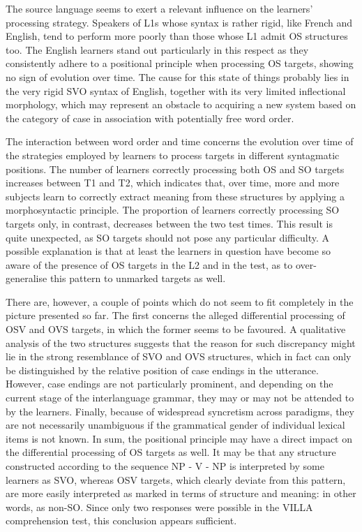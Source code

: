 The source language seems to exert a relevant influence on the learners' processing strategy. Speakers of L1s whose syntax is rather rigid, like French and English, tend to perform more poorly than those whose L1 admit OS structures too. The English learners stand out particularly in this respect as they consistently adhere to a positional principle when processing OS targets, showing no sign of evolution over time. The cause for this state of things probably lies in the very rigid SVO syntax of English, together with its very limited inflectional morphology, which may represent an obstacle to acquiring a new system based on the category of case in association with potentially free word order.

The interaction between word order and time concerns the evolution over time of the strategies employed by learners to process targets in different syntagmatic positions. The number of learners correctly processing both OS and SO targets increases between T1 and T2, which indicates that, over time, more and more subjects learn to correctly extract meaning from these structures by applying a morphosyntactic principle. The proportion of learners correctly processing SO targets only, in contrast, decreases between the two test times. This result is quite unexpected, as SO targets should not pose any particular difficulty. A possible explanation is that at least the learners in question have become so aware of the presence of OS targets in the L2 and in the test, as to over-generalise this pattern to unmarked targets as well.

There are, however, a couple of points which do not seem to fit completely in the picture presented so far. The first concerns the alleged differential processing of OSV and OVS targets, in which the former seems to be favoured. A qualitative analysis of the two structures suggests that the reason for such discrepancy might lie in the strong resemblance of SVO and OVS structures, which in fact can only be distinguished by the relative position of case endings in the utterance. However, case endings are not particularly prominent, and depending on the current stage of the interlanguage grammar, they may or may not be attended to by the learners. Finally, because of widespread syncretism across paradigms, they are not necessarily unambiguous if the grammatical gender of individual lexical items is not known. In sum, the positional principle may have a direct impact on the differential processing of OS targets as well. It may be that any structure constructed according to the sequence NP - V - NP is interpreted by some learners as SVO, whereas OSV targets, which clearly deviate from this pattern, are more easily interpreted as marked in terms of structure and meaning: in other words, as non-SO. Since only two responses were possible in the VILLA comprehension test, this conclusion appears sufficient. 

